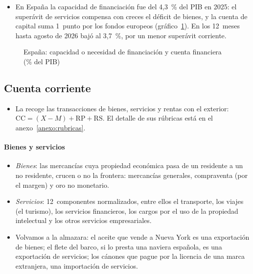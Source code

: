 \documentclass[11pt]{article}
\begin{document}
\begin{itemize}
\item En España la capacidad de financiación fue del 4,3~\% del PIB en 2025: el superávit de servicios compensa con creces el déficit de bienes, y la cuenta de capital suma 1~punto por los fondos europeos (gráfico~\ref{fig:capacidad-financiacion-espana}). En los 12~meses hasta agosto de 2026 bajó al 3,7~\%, por un menor superávit corriente\nocite{BdE2026BE17,BdE2026BPAgosto}.
\end{itemize}

\begin{figure}[!htb]
\centering
\caption{España: capacidad o necesidad de financiación y cuenta financiera (\% del PIB)}\label{fig:capacidad-financiacion-espana}
\end{figure}

\subsection{Cuenta corriente}\label{sec:cuenta-corriente}

\begin{itemize}
\item La  recoge las transacciones de bienes, servicios y rentas con el exterior: $\mathrm{CC}=(X-M)+\mathrm{RP}+\mathrm{RS}$. El detalle de sus rúbricas está en el anexo~\ref{anexo:rubricas}.
\end{itemize}

\paragraph{Bienes y servicios}
\begin{itemize}
\item \emph{Bienes}: las mercancías cuya propiedad económica pasa de un residente a un no residente, crucen o no la frontera: mercancías generales, compraventa (por el margen) y oro no monetario.
\item \emph{Servicios}: 12~componentes normalizados, entre ellos el transporte, los viajes (el turismo), los servicios financieros, los cargos por el uso de la propiedad intelectual y los otros servicios empresariales\nocite{FMI2009MBP6}.
\item Volvamos a la almazara: el aceite que vende a Nueva York es una exportación de bienes; el flete del barco, si lo presta una naviera española, es una exportación de servicios; los cánones que pague por la licencia de una marca extranjera, una importación de servicios.
\end{itemize}
\end{document}
